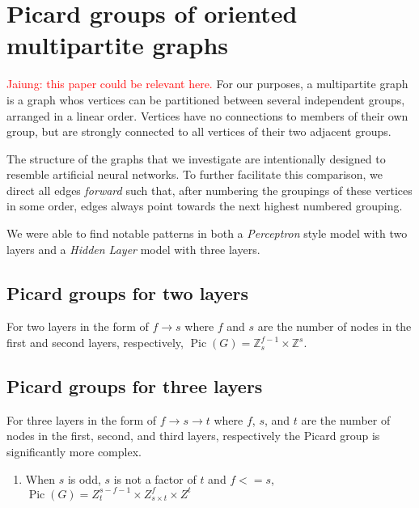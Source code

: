 \documentclass[11pt,reqno]{amsart}
\DeclareMathOperator{\Pic}{Pic}
\theoremstyle{definition}
\theoremstyle{plain}
\begin{document}
\section{Picard groups of oriented multipartite graphs}
\textcolor{red}{Jaiung: this paper \cite{jacobson2003critical} could be relevant here.}
	For our purposes, a multipartite graph is a graph whos vertices can be partitioned between several independent
	groups, arranged in a linear order.  Vertices have no connections to members of their own group, but are strongly
	connected to all vertices of their two adjacent groups.

	The structure of the graphs that we investigate are intentionally designed to resemble artificial neural networks.
	To further facilitate this comparison, we direct all edges \textit{forward} such that, after numbering the groupings
	of these vertices in some order, edges always point towards the next highest numbered grouping.

	We were able to find notable patterns in both a \textit{Perceptron} style model with two layers and a
	\textit{Hidden Layer} model with three layers.

	\subsection{Picard groups for two layers}
		For two layers in the form of $f \rightarrow s$ where $f$ and $s$ are the number of nodes in the first and
		second layers, respectively, $\Pic(G) = \mathbb{Z}_{s}^{f-1} \times \mathbb{Z}^s$.

	\subsection{Picard groups for three layers}
		For three layers in the form of $f \rightarrow s \rightarrow t$ where $f$, $s$, and $t$ are the number of nodes
		in the first, second, and third layers, respectively the Picard group is significantly more complex.

		\begin{enumerate}
			\item When $s$ is odd, $s$ is not a factor of $t$ and $f <= s$,
				$\Pic(G) = Z_{t}^{s-f-1} \times Z_{s \times t}^{f} \times Z^t$
		\end{enumerate}

%
\end{document}
